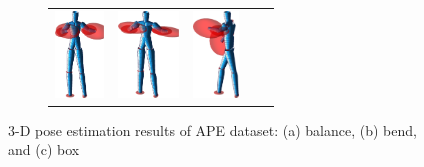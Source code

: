 \begin{figure}
\begin{subfigure}[b]{1\linewidth}
\begin{tabular}{c|cccc}
			\includegraphics[height=2.3cm]{fig/body/APE/boxx2.png} &
			\includegraphics[height=2.3cm]{fig/body/APE/boxx3.png} & 
			\includegraphics[height=2.3cm]{fig/body/APE/boxx4.png} 
		\end{tabular}
		\label{fig/body/APE/boxx} 
	\end{subfigure}
	\caption{3-D pose estimation results of APE dataset: (a) balance, (b) bend, and (c) box}
	\label{fig/body/APE1}
\end{figure}

